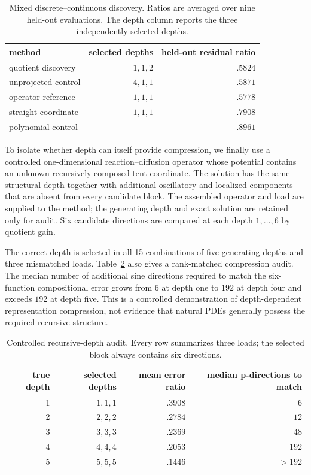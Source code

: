 \documentclass[11pt]{article}
\numberwithin{algorithm}{section}
\theoremstyle{definition}\newtheorem{definition}[theorem]{Definition}
\theoremstyle{remark}\newtheorem{remark}[theorem]{Remark}
\begin{document}
\begin{table}[H]
\centering
\caption{Mixed discrete--continuous discovery.  Ratios are averaged over nine
held-out evaluations.  The depth column reports the three independently
selected depths.}
\label{tab:main-multivariate-discovery}
\begin{tabular}{lrr}
\toprule
method & selected depths & held-out residual ratio\\
\midrule
quotient discovery & $1,1,2$ & $.5824$\\
unprojected control & $4,1,1$ & $.5871$\\
operator reference & $1,1,1$ & $.5778$\\
straight coordinate & $1,1,1$ & $.7908$\\
polynomial control & --- & $.8961$\\
\bottomrule
\end{tabular}
\end{table}

To isolate whether depth can itself provide compression, we finally use a
controlled one-dimensional reaction--diffusion operator whose potential
contains an unknown recursively composed tent coordinate.  The solution has
the same structural depth together with additional oscillatory and localized
components that are absent from every candidate block.  The assembled
operator and load are supplied to the method; the generating depth and exact
solution are retained only for audit.  Six candidate directions are compared
at each depth $1,\ldots,6$ by quotient gain.

The correct depth is selected in all 15 combinations of five generating depths
and three mismatched loads.  Table~\ref{tab:main-recursive-depth} also gives a
rank-matched compression audit.  The median number of additional sine
directions required to match the six-function compositional error grows from
$6$ at depth one to $192$ at depth four and exceeds $192$ at depth five.
This is a controlled demonstration of depth-dependent representation
compression, not evidence that natural PDEs generally possess the required
recursive structure.

\begin{table}[H]
\centering
\caption{Controlled recursive-depth audit.  Every row summarizes three loads;
the selected block always contains six directions.}
\label{tab:main-recursive-depth}
\begin{tabular}{rrrr}
\toprule
true depth & selected depths & mean error ratio
& median p-directions to match\\
\midrule
1 & $1,1,1$ & $.3908$ & $6$\\
2 & $2,2,2$ & $.2784$ & $12$\\
3 & $3,3,3$ & $.2369$ & $48$\\
4 & $4,4,4$ & $.2053$ & $192$\\
5 & $5,5,5$ & $.1446$ & $>192$\\
\bottomrule
\end{tabular}
\end{table}
\end{document}
